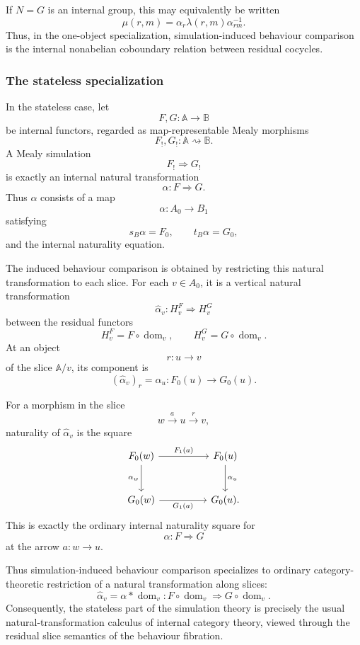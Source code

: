 If \(N=G\) is an internal group, this may equivalently be written
\[
    \mu(r,m)=\alpha_r\lambda(r,m)\alpha_{rm}^{-1}.
\]
Thus, in the one-object specialization, simulation-induced behaviour comparison is the internal nonabelian coboundary relation between residual cocycles.

\subsubsection{The stateless specialization}

In the stateless case, let
\[
    F,G:\mathbb A\to\mathbb B
\]
be internal functors, regarded as map-representable Mealy morphisms
\[
    F_!,G_!:\mathbb A\rightsquigarrow\mathbb B.
\]
A Mealy simulation
\[
    F_!\Rightarrow G_!
\]
is exactly an internal natural transformation
\[
    \alpha:F\Rightarrow G.
\]
Thus \(\alpha\) consists of a map
\[
    \alpha:A_0\to B_1
\]
satisfying
\[
    s_B\alpha=F_0,
    \qquad
    t_B\alpha=G_0,
\]
and the internal naturality equation.

The induced behaviour comparison is obtained by restricting this natural transformation to each slice. For each \(v\in A_0\), it is a vertical natural transformation
\[
    \widehat{\alpha}_v:
        H^F_v
            \Rightarrow
        H^G_v
\]
between the residual functors
\[
    H^F_v=F\circ\operatorname{dom}_v,
    \qquad
    H^G_v=G\circ\operatorname{dom}_v.
\]
At an object
\[
    r:u\to v
\]
of the slice \(\mathbb A/v\), its component is
\[
    (\widehat{\alpha}_v)_r
        =
    \alpha_u:F_0(u)\to G_0(u).
\]

For a morphism in the slice
\[
    w\xrightarrow{a}u\xrightarrow{r}v,
\]
naturality of \(\widehat{\alpha}_v\) is the square
\[
    \begin{tikzcd}[column sep=huge, row sep=large]
            F_0(w)
                \arrow[r, "F_1(a)"]
                \arrow[d, "\alpha_w"']
        &
            F_0(u)
                \arrow[d, "\alpha_u"]
        \\
            G_0(w)
                \arrow[r, "G_1(a)"']
        &
            G_0(u).
    \end{tikzcd}
\]
This is exactly the ordinary internal naturality square for
\[
    \alpha:F\Rightarrow G
\]
at the arrow \(a:w\to u\).

Thus simulation-induced behaviour comparison specializes to ordinary category-theoretic restriction of a natural transformation along slices:
\[
    \widehat{\alpha}_v
        =
    \alpha\ast \operatorname{dom}_v:
        F\circ\operatorname{dom}_v
            \Rightarrow
        G\circ\operatorname{dom}_v.
\]
Consequently, the stateless part of the simulation theory is precisely the usual natural-transformation calculus of internal category theory, viewed through the residual slice semantics of the behaviour fibration.

